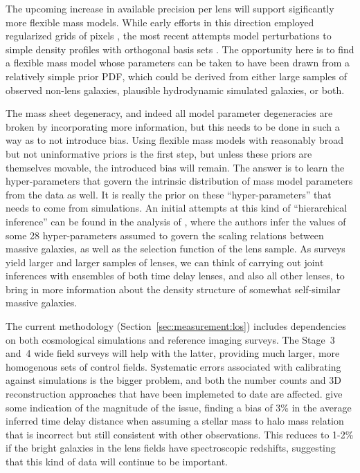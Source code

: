The upcoming increase in available precision per lens will support
sigificantly more flexible mass models. While early efforts in this direction
employed regularized grids of pixels \citep{Koo05,SuyuEtal2009,V+K09a},
the most recent attempts model perturbations to simple density profiles with
orthogonal basis sets \citep{BirrerEtal2015}. The opportunity here is to find a
flexible mass model whose parameters can be taken to have been drawn from
a relatively simple prior PDF, which could be derived from either large samples
of observed non-lens galaxies, plausible hydrodynamic simulated galaxies, or both.


The mass sheet degeneracy, and indeed all model parameter degeneracies
are broken by incorporating more information, but this needs to be done
in such a way as to not introduce bias. Using flexible mass models with
reasonably broad but not uninformative  priors is the first step, but
unless these priors are themselves movable, the introduced bias will
remain. The answer is to learn the hyper-parameters that govern the
intrinsic distribution of mass model parameters from the data as well. It is
really the prior on these ``hyper-parameters'' that  needs to come from
simulations. An initial attempts at this kind of ``hierarchical
inference'' can be found in  the analysis of \citet{SonnenfeldEtal2015},
where the authors  infer the values of some 28 hyper-parameters assumed
to govern the  scaling relations between massive galaxies, as well as
the selection function of the lens sample. As surveys yield larger and
larger samples of lenses, we can think of  carrying out joint inferences
with ensembles of both time delay lenses, and also all other lenses, to
bring in more information about the density structure of somewhat
self-similar massive galaxies.


 The
current methodology (Section~\ref{sec:measurement:los}) includes
dependencies on both cosmological simulations and reference imaging
surveys. The Stage~3 and~4  wide field surveys will help with the
latter, providing much larger, more homogenous sets of control fields.
Systematic errors associated with calibrating against simulations is the
bigger problem, and both the number counts and 3D reconstruction
approaches that have been implemeted to date are affected.
\citet{CollettEtal2013} give some indication of the magnitude of the
issue, finding a bias of 3\% in the average inferred time delay distance
when assuming a stellar mass to halo mass relation that is incorrect
but still consistent with other observations. This reduces to 1-2\%
if the bright galaxies in the lens fields have spectroscopic redshifts,
suggesting that this kind of data will continue to be important.


